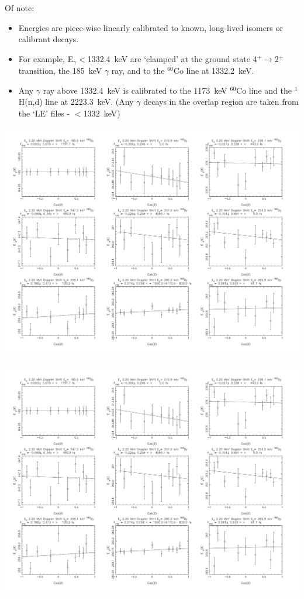 Of note:

\begin{itemize}
\item Energies are piece-wise linearly calibrated to known, long-lived isomers or calibrant decays.
\item For example, E$_\gamma<$1332.4~keV are `clamped' at the ground state 4$^+\rightarrow$2$^+$ transition, the 185~keV $\gamma$ ray, and to the $^{60}$Co line at 1332.2~keV.
\item Any $\gamma$ ray above 1332.4~keV is calibrated to the 1173~keV $^{60}$Co line and the $^1$H(n,d) line at 2223.3~keV. (Any $\gamma$ decays in the overlap region are taken from the `LE' files - $<$1332~keV)
\end{itemize}

\begin{center}
\includegraphics[page=1,angle=90,height=0.95\textheight]{162Dy_ftau_220_LE_n.pdf}
\end{center}
\begin{center}
\includegraphics[page=2,angle=90,height=0.95\textheight]{162Dy_ftau_220_LE_n.pdf}
\end{center}
